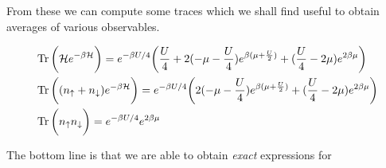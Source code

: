 From these we can compute some traces which we shall find useful to obtain averages of various observables.

\begin{equation}
\begin{split}
&\operatorname{Tr} \bigg( \mathcal{H} e^{-\beta\mathcal{H} } \bigg) = e^{-\beta U / 4} \bigg(\frac{U}{4} + 2 (-\mu - \frac{U}{4})  e^{\beta(\mu + \frac{U}{2})} + (\frac{U}{4} - 2\mu ) e^{2\beta \mu} \bigg) \\
&\operatorname{Tr} \bigg( (n_\uparrow + n_\downarrow ) e^{-\beta\mathcal{H} } \bigg) = e^{-\beta U / 4} \bigg(2 (-\mu - \frac{U}{4})  e^{\beta(\mu + \frac{U}{2})} + (\frac{U}{4} - 2\mu ) e^{2\beta \mu} \bigg) \\
&\operatorname{Tr} \bigg( n_\uparrow n_\downarrow \bigg) = e^{-\beta U/4} e^{2\beta\mu}
\end{split}
\end{equation}

The bottom line is that we are able to obtain \emph{exact} expressions for

